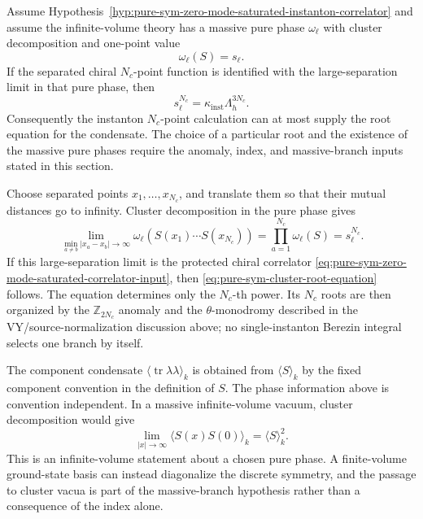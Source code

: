 \begin{remark}
\label{rem:pure-sym-instanton-cluster-extraction}
Assume Hypothesis~\ref{hyp:pure-sym-zero-mode-saturated-instanton-correlator}
and assume the infinite-volume theory has a massive pure phase
\(\omega_\ell\) with cluster decomposition and one-point value
\[
  \omega_\ell(S)=s_\ell .
\]
If the separated chiral \(N_c\)-point function is identified with the
large-separation limit in that pure phase, then
\begin{equation}
  s_\ell^{N_c}
  =
  \kappa_{\mathrm{inst}}\Lambda_h^{3N_c}.
  \label{eq:pure-sym-cluster-root-equation}
\end{equation}
Consequently the instanton \(N_c\)-point calculation can at most supply the
root equation for the condensate.  The choice of a particular root and the
existence of the massive pure phases require the anomaly, index, and
massive-branch inputs stated in this section.

Choose separated points \(x_1,\ldots,x_{N_c}\), and translate them so that
their mutual distances go to infinity.  Cluster decomposition in the pure
phase gives
\[
  \lim_{\min_{a\neq b}|x_a-x_b|\to\infty}
  \omega_\ell\!\left(S(x_1)\cdots S(x_{N_c})\right)
  =
  \prod_{a=1}^{N_c}\omega_\ell(S)
  =
  s_\ell^{N_c}.
\]
If this large-separation limit is the protected chiral correlator
\eqref{eq:pure-sym-zero-mode-saturated-correlator-input}, then
\eqref{eq:pure-sym-cluster-root-equation} follows.  The equation determines
only the \(N_c\)-th power.  Its \(N_c\) roots are then organized by the
\(\mathbb Z_{2N_c}\) anomaly and the \(\theta\)-monodromy described in
the VY/source-normalization discussion above; no
single-instanton Berezin integral selects one branch by itself.
\end{remark}

The component condensate \(\langle\operatorname{tr}\lambda\lambda\rangle_k\)
is obtained from \(\langle S\rangle_k\) by the fixed component convention in
the definition of \(S\).  The phase information above is convention
independent.  In a massive infinite-volume vacuum, cluster decomposition
would give
\[
  \lim_{|x|\to\infty}
  \langle S(x)S(0)\rangle_k
  =
  \langle S\rangle_k^2 .
\]
This is an infinite-volume statement about a chosen pure phase.  A
finite-volume ground-state basis can instead diagonalize the discrete
symmetry, and the passage to cluster vacua is part of the massive-branch
hypothesis rather than a consequence of the index alone.

